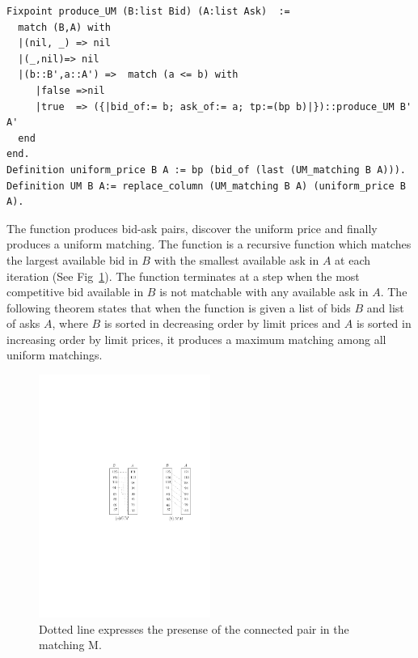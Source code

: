 \documentclass[a4paper,UKenglish,cleveref, autoref]{lipics-v2019}
\begin{document}
\begin{verbatim}
Fixpoint produce_UM (B:list Bid) (A:list Ask)  :=
  match (B,A) with
  |(nil, _) => nil
  |(_,nil)=> nil
  |(b::B',a::A') =>  match (a <= b) with
     |false =>nil
     |true  => ({|bid_of:= b; ask_of:= a; tp:=(bp b)|})::produce_UM B' A'
  end
end.
Definition uniform_price B A := bp (bid_of (last (UM_matching B A))).
Definition UM B A:= replace_column (UM_matching B A) (uniform_price B A).
\end{verbatim}


The function  produces bid-ask pairs,  discover the uniform price and finally  produces a uniform matching. The function  is a recursive function which matches the largest available bid in $B$ with the smallest available ask in $A$ at each iteration (See Fig~\ref{fig:UM}). The function   terminates at a step when the most competitive bid available in $B$ is not matchable with any available ask in $A$. The following theorem states that when the function  is given a list of bids $B$ and list of asks $A$, where $B$ is sorted in decreasing order by limit prices and $A$ is sorted in increasing order by limit prices,  it produces a maximum matching among all uniform matchings.

\begin{theorem}
\end{theorem}

\begin{figure}[h!]
\centering
\includegraphics[width=0.5\textwidth]{UM.pdf}
\caption{Dotted line expresses the presense of the connected pair in the matching M. }
\label{fig:UM}
\end{figure}
\end{document}
